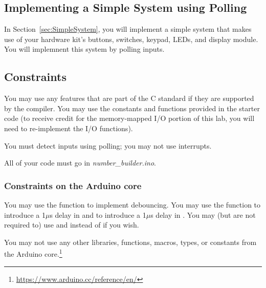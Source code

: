 \subsection{Implementing a Simple System using Polling}

In Section~\ref{sec:SimpleSystem}, you will implement a simple system that makes use of your hardware kit's buttons, switches, keypad, LEDs, and display module.
You will implemnent this system by polling inputs.


\subsection{Constraints} \label{sec:Constraints}

You may use any features that are part of the C standard if they are supported by the compiler. You may use the constants and functions provided in the starter code (to receive credit for the memory-mapped I/O portion of this lab, you will need to re-implement the I/O functions).

You must detect inputs using polling; you may not use interrupts.

All of your code must go in \textit{number\_builder.ino}.

\subsubsection{Constraints on the Arduino core}

You may use the  function to implement debouncing.
You may use the  function to introduce a 1$\mu$s delay in  and to introduce a 1$\mu$s delay in .
You may (but are not required to) use  and  instead of  if you wish.

You may not use any other libraries, functions, macros, types, or constants from the Arduino core.\footnote{\url{https://www.arduino.cc/reference/en/}}

